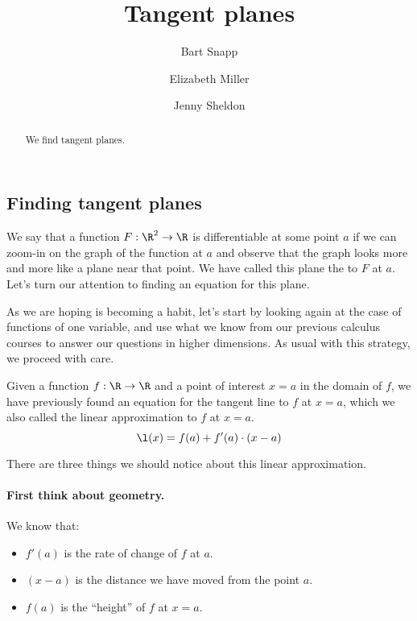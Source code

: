 \documentclass{ximera}
\author{Bart Snapp \and Elizabeth Miller \and Jenny Sheldon}
\title[Dig-In:]{Tangent planes}
\begin{document}
\begin{abstract}
  We find tangent planes.
\end{abstract}
\maketitle



\subsection{Finding tangent planes}

We say that a function $F: \R^2 \to \R$ is differentiable at some
point $a$ if we can zoom-in on the graph of the function at $a$ and
observe that the graph looks more and more like a plane near that
point.  We have called this plane the  to $F$ at
$a$. Let's turn our attention to finding an equation for this plane.

As we are hoping is becoming a habit, let's start by looking again at
the case of functions of one variable, and use what we know from our
previous calculus courses to answer our questions in higher
dimensions.  As usual with this strategy, we proceed with care.

Given a function $f : \R \to \R$ and a point of interest $x=a$ in the
domain of $f$, we have previously found an equation for the tangent
line to $f$ at $x=a$, which we also called the linear approximation to
$f$ at $x=a$.
\[
\l(x) = f(a) + f'(a) \cdot (x-a)
\]

There are three things we should notice about this linear
approximation.

\paragraph{First think about geometry.}  We know that:
\begin{itemize}
\item $f'(a)$ is the rate of change of $f$ at $a$.
\item $(x-a)$ is the distance we have moved from the point $a$.
\item $f(a)$ is the ``height'' of $f$ at $x=a$.
\end{itemize}
\end{document}
